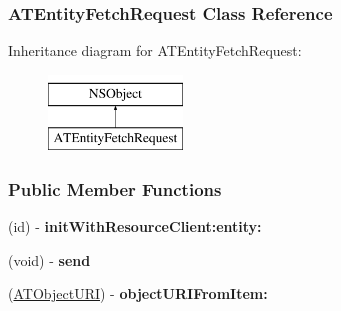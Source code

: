 \hypertarget{interface_a_t_entity_fetch_request}{
\subsubsection{ATEntityFetchRequest Class Reference}
\label{interface_a_t_entity_fetch_request}
}
Inheritance diagram for ATEntityFetchRequest:\begin{figure}[h]
\begin{center}
\leavevmode
\includegraphics[height=2.000000cm]{interface_a_t_entity_fetch_request}
\end{center}
\end{figure}
\subsubsection*{Public Member Functions}
\begin{DoxyCompactItemize}
\item 
\hypertarget{interface_a_t_entity_fetch_request_a675e97f5dd42dc681c481648ef1d39b5}{
(id) -\/ {\bfseries initWithResourceClient:entity:}}
\label{interface_a_t_entity_fetch_request_a675e97f5dd42dc681c481648ef1d39b5}

\item 
\hypertarget{interface_a_t_entity_fetch_request_a72842e3aa37c2d86fb2f728aee1796fe}{
(void) -\/ {\bfseries send}}
\label{interface_a_t_entity_fetch_request_a72842e3aa37c2d86fb2f728aee1796fe}

\item 
\hypertarget{interface_a_t_entity_fetch_request_aef0c30154968bce6a9e0ead2c0c0fe98}{
(\hyperlink{struct___a_t_object_u_r_i}{ATObjectURI}) -\/ {\bfseries objectURIFromItem:}}
\label{interface_a_t_entity_fetch_request_aef0c30154968bce6a9e0ead2c0c0fe98}

\end{DoxyCompactItemize}
